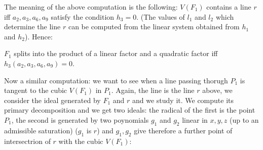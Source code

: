 \documentclass[11pt]{article}
\begin{document}
    The meaning of the above computation is the following: \(V(F_1)\)
contains a line \(r\) iff \(a_2, a_3, a_6, a_9\) satisfy the condition
\(h_3=0\). (The values of \(l_1\) and \(l_2\) which determine the line
\(r\) can be computed from the linear system obtained from \(h_1\) and
\(h_2\)). Hence:

\(F_1\) splits into the product of a linear factor and a quadratic
factor iff \(h_3(a_2, a_3, a_6, a_9) = 0\).

Now a similar computation: we want to see when a line passing thorugh
\(P_1\) is tangent to the cubic \(V(F_1)\) in \(P_1\). Again, the line
is the line \(r\) above, we consider the ideal generated by \(F_1\) and
\(r\) and we study it. We compute its primary decomposition and we get
two ideals: the radical of the first is the point \(P_1\), the second is
generated by two poynomials \(g_1\) and \(g_2\) linear in \(x, y, z\)
(up to an admissible saturation) (\(g_1\) is \(r\)) and \(g_1, g_2\)
give therefore a further point of intersectrion of \(r\) with the cubic
\(V(F_1)\):
\end{document}

